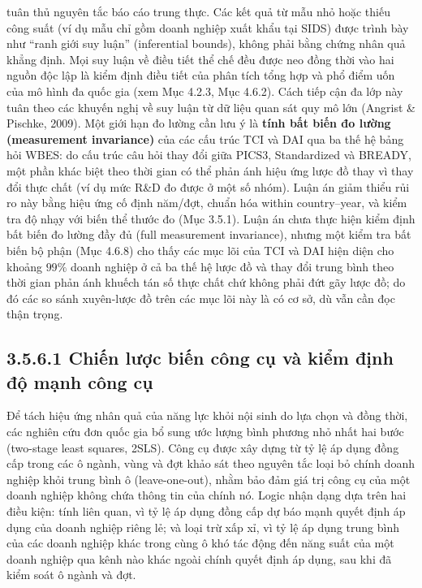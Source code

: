 \documentclass[
  a4paper,
  13pt]{extreport}
\begin{document}
tuân thủ nguyên tắc báo cáo trung thực. Các kết quả từ mẫu nhỏ hoặc
thiếu công suất (ví dụ mẫu chỉ gồm doanh nghiệp xuất khẩu tại SIDS) được
trình bày như ``ranh giới suy luận'' (inferential bounds), không phải
bằng chứng nhân quả khẳng định. Mọi suy luận về điều tiết thể chế đều
được neo đồng thời vào hai nguồn độc lập là kiểm định điều tiết của phân
tích tổng hợp và phổ điểm uốn của mô hình đa quốc gia (xem Mục 4.2.3,
Mục 4.6.2). Cách tiếp cận đa lớp này tuân theo các khuyến nghị về suy
luận từ dữ liệu quan sát quy mô lớn (Angrist \& Pischke, 2009). Một giới
hạn đo lường cần lưu ý là \textbf{tính bất biến đo lường (measurement
invariance)} của các cấu trúc TCI và DAI qua ba thế hệ bảng hỏi WBES: do
cấu trúc câu hỏi thay đổi giữa PICS3, Standardized và BREADY, một phần
khác biệt theo thời gian có thể phản ánh hiệu ứng lược đồ thay vì thay
đổi thực chất (ví dụ mức R\&D đo được ở một số nhóm). Luận án giảm thiểu
rủi ro này bằng hiệu ứng cố định năm/đợt, chuẩn hóa within
country--year, và kiểm tra độ nhạy với biến thể thước đo (Mục 3.5.1).
Luận án chưa thực hiện kiểm định bất biến đo lường đầy đủ (full
measurement invariance), nhưng một kiểm tra bất biến bộ phận (Mục 4.6.8)
cho thấy các mục lõi của TCI và DAI hiện diện cho khoảng \(99\%\) doanh
nghiệp ở cả ba thế hệ lược đồ và thay đổi trung bình theo thời gian phản
ánh khuếch tán số thực chất chứ không phải đứt gãy lược đồ; do đó các so
sánh xuyên-lược đồ trên các mục lõi này là có cơ sở, dù vẫn cần đọc thận
trọng.

\hypertarget{chiux1ebfn-lux1b0ux1ee3c-biux1ebfn-cuxf4ng-cux1ee5-vuxe0-kiux1ec3m-ux111ux1ecbnh-ux111ux1ed9-mux1ea1nh-cuxf4ng-cux1ee5}{%
\subsection{3.5.6.1 Chiến lược biến công cụ và kiểm định độ mạnh công
cụ}\label{chiux1ebfn-lux1b0ux1ee3c-biux1ebfn-cuxf4ng-cux1ee5-vuxe0-kiux1ec3m-ux111ux1ecbnh-ux111ux1ed9-mux1ea1nh-cuxf4ng-cux1ee5}}

Để tách hiệu ứng nhân quả của năng lực khỏi nội sinh do lựa chọn và đồng
thời, các nghiên cứu đơn quốc gia bổ sung ước lượng bình phương nhỏ nhất
hai bước (two-stage least squares, 2SLS). Công cụ được xây dựng từ tỷ lệ
áp dụng đồng cấp trong các ô ngành, vùng và đợt khảo sát theo nguyên tắc
loại bỏ chính doanh nghiệp khỏi trung bình ô (leave-one-out), nhằm bảo
đảm giá trị công cụ của một doanh nghiệp không chứa thông tin của chính
nó. Logic nhận dạng dựa trên hai điều kiện: tính liên quan, vì tỷ lệ áp
dụng đồng cấp dự báo mạnh quyết định áp dụng của doanh nghiệp riêng lẻ;
và loại trừ xấp xỉ, vì tỷ lệ áp dụng trung bình của các doanh nghiệp
khác trong cùng ô khó tác động đến năng suất của một doanh nghiệp qua
kênh nào khác ngoài chính quyết định áp dụng, sau khi đã kiểm soát ô
ngành và đợt.
\end{document}

